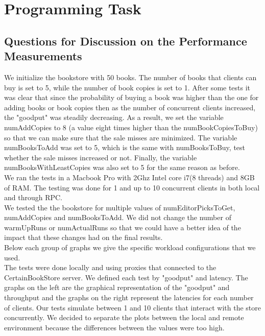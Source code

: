 \documentclass{article}      %
\begin{document}
\section*{Programming Task}

\subsection*{Questions for Discussion on the Performance Measurements}

We initialize the bookstore with 50 books. The number of books that clients can buy is set to 5, while the number of book copies is set to 1. After some tests it was clear that since the probability of buying a book was higher than the one for adding books or book copies then as the number of concurrent clients increased, the "goodput" was steadily decreasing. As a result, we set the variable numAddCopies to 8 (a value eight times higher than the numBookCopiesToBuy) so that we can make sure that the sale misses are minimized.  The variable numBooksToAdd was set to 5, which is the same with numBooksToBuy, test whether the sale misses increased or not. Finally, the variable numBooksWithLeastCopies was also set to 5 for the same reason as before.\\

We ran the tests in a Macbook Pro with 2Ghz Intel core i7(8 threads) and 8GB of RAM. The testing was done for 1 and up to 10 concurrent clients in both local and through RPC. \\

We tested the the bookstore for multiple values of numEditorPicksToGet, numAddCopies and numBooksToAdd. We did not change the number of warmUpRuns or numActualRuns so that we could have a better idea of the impact that these changes had on the final results.\\

Below each group of graphs we give the specific workload configurations that we used.\\

The tests were done locally and using proxies that connected to the CertainBookStore server. We defined each test by "goodput" and latency. The graphs on the left are the graphical representation of the "goodput" and throughput and the graphs on the right represent the latencies for each number of clients. Our tests simulate between 1 and 10 clients that interact with the store concurrently. We decided to separate the plots between the local and remote environment because the differences between the values were too high.\\
\end{document}
